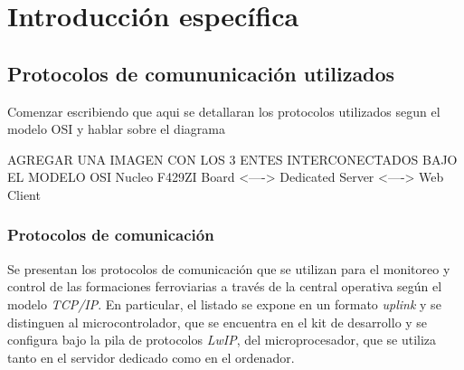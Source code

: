\chapter{Introducción específica} %

\label{Chapter2}


\section{Protocolos de comununicación utilizados}

  Comenzar escribiendo que aqui se detallaran los protocolos utilizados segun el modelo OSI y hablar sobre el diagrama    

  AGREGAR UNA IMAGEN CON LOS 3 ENTES INTERCONECTADOS BAJO EL MODELO OSI 
        Nucleo F429ZI Board <----> Dedicated Server <----> Web Client


\subsection{Protocolos de comunicación}

Se presentan los protocolos de comunicación que se utilizan para el monitoreo y control de las formaciones ferroviarias a través de la central operativa según el modelo \textit{TCP/IP}. En particular, el listado se expone en un formato \textit{uplink} y se distinguen al microcontrolador, que se encuentra en el kit de desarrollo y se configura bajo la pila de protocolos \textit{LwIP}, del microprocesador, que se utiliza tanto en el servidor dedicado como en el ordenador. 




